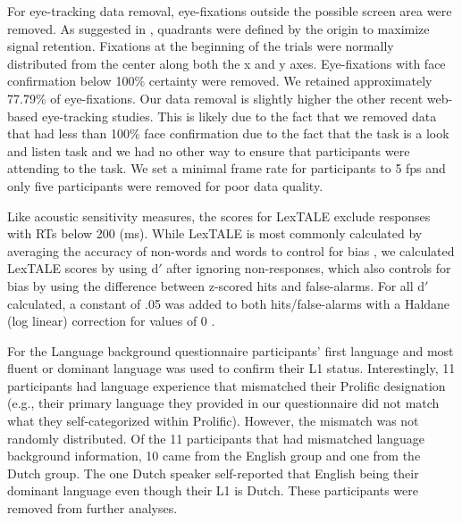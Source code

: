For eye-tracking data removal, eye-fixations outside the possible screen area were removed. As suggested in \cite{AOW}, quadrants were defined by the origin to maximize signal retention. Fixations at the beginning of the trials were normally distributed from the center along both the x and y axes. Eye-fixations with face confirmation below 100\% certainty were removed. We retained approximately 77.79\% of eye-fixations. Our data removal is slightly higher the other recent web-based eye-tracking studies. This is likely due to the fact that we removed data that had less than 100\% face confirmation due to the fact that the task is a look and listen task and we had no other way to ensure that participants were attending to the task. We set a minimal frame rate for participants to 5 fps \citep{Vos_2022} and only five participants were removed for poor data quality.

Like acoustic sensitivity measures, the scores for LexTALE exclude responses with RTs below 200 (ms). While LexTALE is most commonly calculated by averaging the accuracy of non-words and words to control for bias \citep{lemhofer2012introducing}, we calculated LexTALE scores by using d$'$ after ignoring non-responses, which also controls for bias by using the difference between z-scored hits and false-alarms. For all d$'$ calculated, a constant of .05 was added to both hits/false-alarms with a Haldane (log linear) correction for values of 0 \citep{Hautus1995}. 

For the Language background questionnaire participants' first language and most fluent or dominant language was used to confirm their L1 status. Interestingly, 11 participants had language experience that mismatched their Prolific designation (e.g., their primary language they provided in our questionnaire did not match what they self-categorized within Prolific). However, the mismatch was not randomly distributed. Of the 11 participants that had mismatched language background information, 10 came from the English group and one from the Dutch group. The one Dutch speaker self-reported that English being their dominant language even though their L1 is Dutch. These participants were removed from further analyses.

